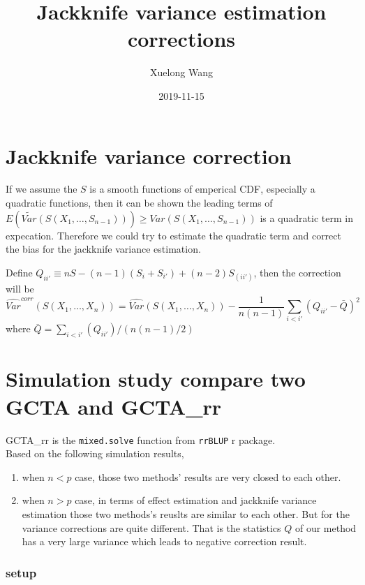 \documentclass[]{article}
\title{Jackknife variance estimation corrections}
\author{Xuelong Wang}
\date{2019-11-15}
\providecommand{\tightlist}{%
  \setlength{\itemsep}{0pt}\setlength{\parskip}{0pt}}
\begin{document}
\maketitle

{
\setcounter{tocdepth}{2}
\tableofcontents
}
\section{Jackknife variance
correction}\label{jackknife-variance-correction}

If we assume the \(S\) is a smooth functions of emperical CDF,
especially a quadratic functions, then it can be shown the leading terms
of
\(E(\tilde{Var}(S(X_1, \dots, S_{n-1}))) \geq Var(S(X_1, \dots, S_{n-1}))\)
is a quadratic term in expecation. Therefore we could try to estimate
the quadratic term and correct the bias for the jackknife variance
estimation.

Define \(Q_{ii'} \equiv nS - (n-1)(S_{i} + S_{i'}) + (n-2)S_{(ii')}\),
then the correction will be \[
\hat{Var}^{corr}(S(X_1, \dots, X_n)) = \hat{Var}(S(X_1, \dots, X_n)) - \frac{1}{n(n-1)}\sum_{i < i'}(Q_{ii'}- \bar{Q})^2
\] where \(\bar{Q} = \sum_{i < i'}(Q_{ii'})/(n(n-1)/2)\)

\section{Simulation study compare two GCTA and
GCTA\_rr}\label{simulation-study-compare-two-gcta-and-gcta_rr}

GCTA\_rr is the \texttt{mixed.solve} function from \texttt{rrBLUP} r
package.\\
Based on the following simulation results,

\begin{enumerate}
\def\labelenumi{\arabic{enumi}.}
\tightlist
\item
  when \(n<p\) case, those two methods' results are very closed to each
  other.
\item
  when \(n>p\) case, in terms of effect estimation and jackknife
  variance estimation those two methods's reuslts are similar to each
  other. But for the variance corrections are quite different. That is
  the statistics \(Q\) of our method has a very large variance which
  leads to negative correction result.
\end{enumerate}

\subsubsection{setup}\label{setup}
\end{document}
